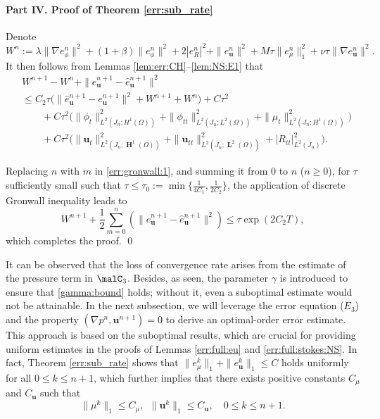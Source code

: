 \paragraph{\bf \indent Part IV. Proof of Theorem \ref{err:sub_rate}}
Denote
\[
W^n:= \lambda \|\nabla e_\phi^n\|^2 + (1+\beta)\| e_\phi^n\|^2 + 2|e_R^n|^2+ \|e_{\bm u}^n\|^2 + M\tau\|e_\mu^n\|_1^2 + \nu \tau \|\nabla e_{\bm u}^n\|^2.
\]
It then follows from Lemmas \ref{lem:err:CH}--\ref{lem:NS:E1} that 
\begin{equation} \label{err:gronwall:1}
	\begin{aligned}
		& W^{n+1} - W^n +  \|e_{\bm u}^{n+1}-\widehat{e}_{\bm u}^{n+1}\|^2   \\
		& \le  C_2 \tau \big(\|\widehat{e}_{\bm u}^{n+1}-e_{\bm u}^{n+1}\|^2+  W^{n+1}+ W^n\big)   +C \tau^2   \\
		& \qquad  
		 +  C \tau^2 \big(\|\phi_t\|_{L^2(J_n ; H^1(\Omega))}^2  + \|\phi_{tt}\|_{L^2(J_n ; L^2(\Omega))}^2 + \|\mu_t\|_{L^2(J_n ; H^1(\Omega))}^2\big)\\
		&  \qquad  +  C \tau^2 \big(    \|\bm u_t\|_{L^2(J_n ; \mbfH^1(\Omega))}^2 + \|\bm u_{tt}\|_{L^2(J_n;  \mbfL^2(\Omega))}^2+|R_{tt}|_{L^2(J_n)}^2\big).
	\end{aligned}
\end{equation} 

Replacing  $n$ with  $m$ in \eqref{err:gronwall:1}, and summing it from 0 to $n$ ($n \ge 0$),    for $\tau$ sufficiently small such that  $\tau \le  \tau_0:= \min\{\frac{1}{4C_1}, \frac{1}{2C_2}\}$,  the application of  discrete Gronwall inequality leads to 
\begin{equation*}
	W^{n+1} + \frac{1}{2}\sum_{m=0}^{n} ( \|e_{\bm u}^{n+1}-\widehat{e}_{\bm u}^{n+1}\|^2 ) \leq \tau \exp(2C_2T),
\end{equation*}
which completes the proof. \qed

\begin{remark} \label{remk:sub_rate:1}
	It can be observed that the loss of convergence rate arises from the estimate of the pressure term in ${\malC}_3$. Besides, as seen, the parameter $\gamma$ is introduced to ensure that \eqref{gamma:bound} holds; without it, even a suboptimal estimate would not be attainable. In the next subsection, we will leverage the error equation ($E_3$) and the property $(\nabla p^n, \bm u^{n+1}) = 0$ to derive an optimal-order error estimate. This approach is based on the suboptimal results, which are crucial for providing uniform estimates in the proofs of Lemmas \ref{err:full:eu} and \ref{err:full:stokes:NS}.
	In fact, Theorem \ref{err:sub_rate} shows that $\|e_\mu^k\|_1 + \| e_{\bm u}^k \|_1 \le  C$ holds  uniformly for all $0\leq k\leq n+1$, 
	which further implies that there exists  positive constants $ C_{\mu}$ and $C_{\bm u}$ such that 
	\begin{equation}\label{bound:mu}
		\|\mu^k\|_1 \le  C_{\mu}, ~~ \|\bm u^k\|_1 \le  C_{\bm u}, \quad 0\leq k\leq n+1.
	\end{equation}
\end{remark}

